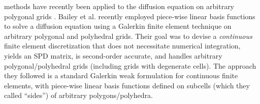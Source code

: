 \documentclass[preprint,10pt]{elsarticle}
\begin{document}
methods have recently been applied to the diffusion equation on arbitrary polygonal 
grids \cite{Kuznetsov2004,Brezzi2005,LipnikovShashkovSvyatskiy2006,LipnikovShashkov2010}.
%
Bailey et al. \cite{BaileyAdams2008} recently employed piece-wise linear basis
functions to solve a diffusion equation using a Galerkin finite element technique on 
arbitrary polygonal and polyhedral grids. Their goal was to devise a {\em continuous} finite 
element discretization that does not necessitate numerical integration, yields an SPD matrix, 
is second-order accurate, and handles arbitrary polygonal/polyhedral grids (including 
grids with degenerate cells). The approach they followed is a standard Galerkin weak 
formulation for continuous finite elements, with piece-wise linear basis functions 
defined on subcells (which they called ``sides'') of arbitrary polygons/polyhedra.
\end{document}

